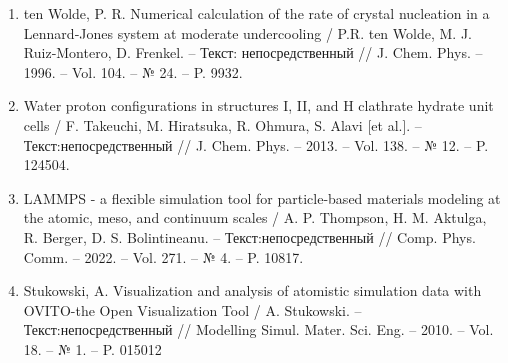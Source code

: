 \begin{enumerate}
    \item ten Wolde, P. R. Numerical calculation of the rate of crystal nucleation in a Lennard‐Jones system at moderate undercooling / P.R. ten Wolde, M. J. Ruiz‐Montero, D. Frenkel. -- Текст: непосредственный // J. Chem. Phys. -- 1996. -- Vol. 104. -- № 24. -- P. 9932.
    \item Water proton configurations in structures I, II, and H clathrate hydrate unit cells / F. Takeuchi, M. Hiratsuka, R. Ohmura, S. Alavi [et al.]. -- Текст:непосредственный // J. Chem. Phys. -- 2013. -- Vol. 138. -- № 12. -- P. 124504.
    \item LAMMPS - a flexible simulation tool for particle-based materials modeling at the atomic, meso, and continuum scales / A. P. Thompson, H. M. Aktulga, R. Berger, D. S. Bolintineanu. -- Текст:непосредственный // Comp. Phys. Comm. -- 2022. -- Vol. 271. -- № 4. -- P. 10817.
    \item Stukowski, A. Visualization and analysis of atomistic simulation data with OVITO-the Open Visualization Tool / A. Stukowski. -- Текст:непосредственный // Modelling Simul. Mater. Sci. Eng. -- 2010. -- Vol. 18. -- № 1. -- P. 015012

\end{enumerate}